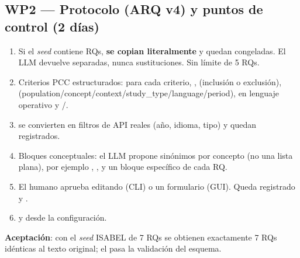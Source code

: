 \documentclass[11pt,a4paper]{article}
\newcommand{\WP}[1]{\textbf{\textcolor{palet}{WP#1}}}
\begin{document}
\subsection*{\WP{2} — Protocolo (ARQ v4) y puntos de control (2 días)}
\begin{enumerate}
  \item Si el \emph{seed} contiene RQs, \textbf{se copian literalmente} y quedan congeladas. El LLM devuelve  separadas, nunca sustituciones. Sin límite de 5 RQs.
  \item Criterios PCC estructurados: para cada criterio, ,  (inclusión o exclusión),  (population/concept/context/study\_type/language/period),  en lenguaje operativo y /.
  \item {} se convierten en filtros de API reales (año, idioma, tipo) y quedan registrados.
  \item Bloques conceptuales: el LLM propone sinónimos por concepto (no una lista plana), por ejemplo , ,  y un bloque específico de cada RQ.
  \item El humano aprueba editando  (CLI) o un formulario (GUI). Queda registrado  y .
  \item {} y  desde la configuración.
\end{enumerate}
\textbf{Aceptación}: con el \emph{seed} ISABEL de 7 RQs se obtienen exactamente 7 RQs idénticas al texto original; el  pasa la validación del esquema.

\end{document}
